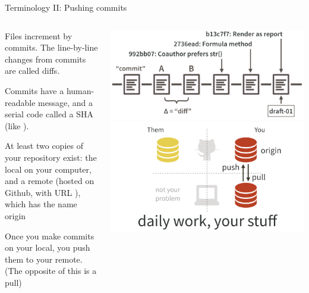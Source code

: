 \documentclass[ignorenonframetext, 10pt, aspectratio=169]{beamer}
\begin{document}
\begin{frame}{Terminology II: Pushing commits}
\begin{columns}
\begin{column}{0.5\textwidth}
\begin{wideitemize}
\item<1-> Files increment by \alert{commit}s. The line-by-line changes from commits are called \alert{diffs}.
\item<2-> Commits have a human-readable \alert{message}, and a serial code called a \alert{SHA} (like ).
\item<3-> At least two copies of your repository exist: the \alert{local} on your computer, and a \alert{remote} (hosted on Github, with URL ), \pause which has the name \alert{origin}
\item<4-> Once you make commits on your local, you \alert{push} them to your remote. (The opposite of this is a \alert{pull})
\end{wideitemize}
\end{column}
\begin{column}{0.5\textwidth}
\includegraphics[width = \linewidth]{commit-diff-sha-tag.png}
\includegraphics[width = \linewidth]{pull-push-yours.png}
\end{column}
\end{columns}
\end{frame}
\end{document}
